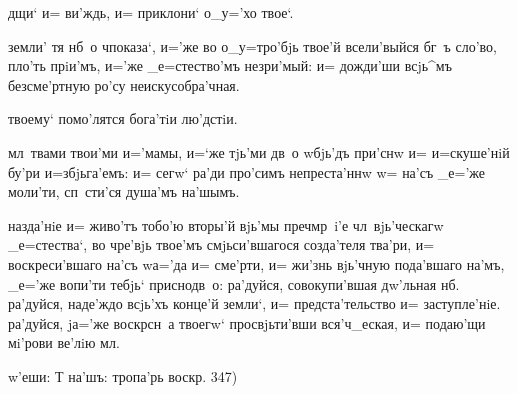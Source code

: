   дщи` и= ви'ждь, и= приклони` 
о_у='хо твое`.

 земли' тя нб~о ч показа`, и='же во 
о_у=тро'бjь твое'й всели'выйся бг~ъ сло'во, пло'ть 
прiи'мъ, и='же _е=стество'мъ незри'мый: и= дожди'ши 
всjь^мъ безсме'ртную ро'су неискусобра'чная.

  твоему` помо'лятся бога'тiи 
лю'дстiи.

 мл~твами твои'ми и='мамы, и=`же тjь'ми 
дв~о w\т бjь'дъ при'снw и= и=скуше'нiй бу'ри 
и=збjьга'емъ: и= сегw` ра'ди про'симъ непреста'ннw w= 
на'съ _е='же моли'ти, сп~сти'ся душа'мъ на'шымъ.

 

 назда'нiе и= живо'тъ тобо'ю вторы'й вjь'мы 
преч мр~i'е чл~вjь'ческагw _е=стества`, во чре'вjь 
твое'мъ смjьси'вшагося созда'теля тва'ри, и= 
воскреси'вшаго на'съ w\т а='да и= сме'рти, и= жи'знь 
вjь'чную пода'вшаго на'мъ, _е='же вопи'ти тебjь` 
приснодв~о: ра'дуйся, совокупи'вшая дw'льная нб. 
ра'дуйся, наде'ждо всjь'хъ конце'й земли`, и= 
предста'тельство и= заступле'нiе. ра'дуйся, jа='же 
воскр сн~а твоегw` просвjьти'вши вся'ч_еская, и= 
подаю'щи мi'рови ве'лiю мл.

  w'еши: Т    на'шъ: тропа'рь воскр.        347)\kinovarsimple{}
